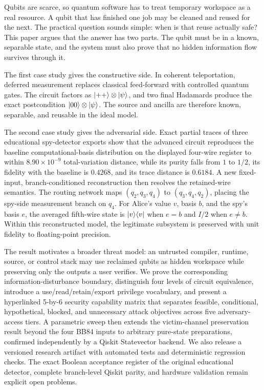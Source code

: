 Qubits are scarce, so quantum software has to treat temporary workspace as a
real resource. A qubit that has finished one job may be cleaned and reused for
the next. The practical question sounds simple: when is that reuse actually
safe? This paper argues that the answer has two parts. The qubit must be in a
known, separable state, and the system must also prove that no hidden
information flow survives through it.

The first case study gives the constructive side. In coherent teleportation,
deferred measurement replaces classical feed-forward with controlled quantum
gates. The circuit factors as
$\ket{++}\otimes\ket{\psi}$, and two final Hadamards produce the exact
postcondition $\ket{00}\otimes\ket{\psi}$. The source and ancilla are therefore
known, separable, and reusable in the ideal model.

The second case study gives the adversarial side. Exact partial traces of three
educational spy-detector exports show that the advanced circuit reproduces the
baseline computational-basis distribution on the displayed four-wire register
to within $8.90\times10^{-9}$ total-variation distance, while its purity falls
from $1$ to $1/2$, its fidelity with the baseline is $0.4268$, and its trace
distance is $0.6184$. A new fixed-input, branch-conditioned reconstruction then
resolves the retained-wire semantics. The routing network maps
$(q_2,q_3,q_4)$ to $(q_3,q_4,q_2)$, placing the spy-side measurement branch on
$q_4$. For Alice's value $v$, basis $b$, and the spy's basis $e$, the averaged
fifth-wire state is $\ket{v}\!\bra{v}$ when $e=b$ and $I/2$ when $e\neq b$.
Within this reconstructed model, the legitimate subsystem is preserved with
unit fidelity to floating-point precision.

The result motivates a broader threat model: an untrusted compiler, runtime,
source, or control stack may use reclaimed qubits as hidden workspace while
preserving only the outputs a user verifies. We prove the corresponding
information-disturbance boundary, distinguish four levels of circuit
equivalence, introduce a use/read/retain/export privilege vocabulary, and
present a hyperlinked 5-by-6 security capability matrix that separates
feasible, conditional, hypothetical, blocked, and unnecessary attack
objectives across five adversary-access tiers. A parametric sweep then extends
the victim-channel preservation result beyond the four BB84 inputs to arbitrary
pure-state preparations, confirmed independently by a Qiskit Statevector backend.
We also release a versioned research artifact with automated tests and
deterministic regression checks. The exact Boolean acceptance register of the
original educational detector, complete branch-level Qiskit parity, and hardware
validation remain explicit open problems.
